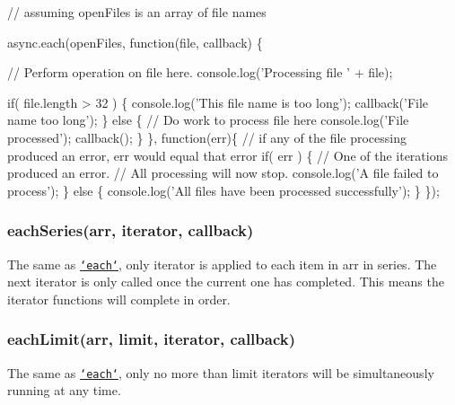 \begin{DoxyCode}
\textcolor{comment}{// assuming openFiles is an array of file names }

async.each(openFiles, \textcolor{keyword}{function}(file, callback) \{

  \textcolor{comment}{// Perform operation on file here.}
  console.log(\textcolor{stringliteral}{'Processing file '} + file);

  \textcolor{keywordflow}{if}( file.length > 32 ) \{
    console.log(\textcolor{stringliteral}{'This file name is too long'});
    callback(\textcolor{stringliteral}{'File name too long'});
  \} \textcolor{keywordflow}{else} \{
    \textcolor{comment}{// Do work to process file here}
    console.log(\textcolor{stringliteral}{'File processed'});
    callback();
  \}
\}, \textcolor{keyword}{function}(err)\{
    \textcolor{comment}{// if any of the file processing produced an error, err would equal that error}
    \textcolor{keywordflow}{if}( err ) \{
      \textcolor{comment}{// One of the iterations produced an error.}
      \textcolor{comment}{// All processing will now stop.}
      console.log(\textcolor{stringliteral}{'A file failed to process'});
    \} \textcolor{keywordflow}{else} \{
      console.log(\textcolor{stringliteral}{'All files have been processed successfully'});
    \}
\});
\end{DoxyCode}
 



\label{_forEachSeries}%
 \label{_eachSeries}%
 \subsubsection*{each\+Series(arr, iterator, callback)}

The same as \href{#each}{\tt `each`}, only {\ttfamily iterator} is applied to each item in {\ttfamily arr} in series. The next {\ttfamily iterator} is only called once the current one has completed. This means the {\ttfamily iterator} functions will complete in order.





\label{_forEachLimit}%
 \label{_eachLimit}%
 \subsubsection*{each\+Limit(arr, limit, iterator, callback)}

The same as \href{#each}{\tt `each`}, only no more than {\ttfamily limit} {\ttfamily iterator}s will be simultaneously running at any time.

